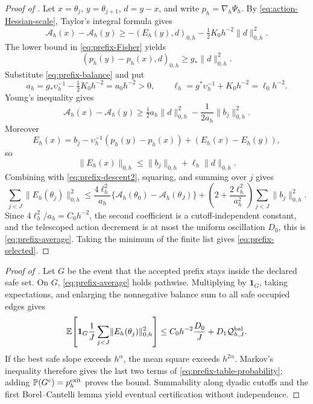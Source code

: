 \documentclass[11pt]{article}
\numberwithin{equation}{section}
\theoremstyle{definition}
\theoremstyle{remark}
\newcommand{\norm}[1]{\lVert#1\rVert}
\begin{document}
\begin{proof}[Proof of ]
Let $x=\theta_j$, $y=\theta_{j+1}$, $d=y-x$, and write $p_h=\nabla_h\Psi_h$.  By \eqref{eq:action-Hessian-scale}, Taylor's integral formula gives
\begin{equation}
 \mathcal A_h(x)-\mathcal A_h(y)
 \ge -(E_h(y),d)_{0,h}-\tfrac12K_0h^{-2}\norm d_{0,h}^2.
 \label{eq:prefix-descent1}
\end{equation}
The lower bound in \eqref{eq:prefix-Fisher} yields
\[
 (p_h(y)-p_h(x),d)_{0,h}\ge g_*\norm d_{0,h}^2.
\]
Substitute \eqref{eq:prefix-balance} and put
\[
 a_h=g_*\upsilon_h^{-1}-\tfrac12K_0h^{-2}=a_0h^{-2}>0,
 \qquad
 \ell_h=g^*\upsilon_h^{-1}+K_0h^{-2}=\ell_0h^{-2}.
\]
Young's inequality gives
\begin{equation}
 \mathcal A_h(x)-\mathcal A_h(y)
 \ge \tfrac12a_h\norm d_{0,h}^2
 -\frac1{2a_h}\norm{b_j}_{0,h}^2.
 \label{eq:prefix-descent2}
\end{equation}
Moreover
\[
 E_h(x)=b_j-\upsilon_h^{-1}(p_h(y)-p_h(x))
                 +(E_h(x)-E_h(y)),
\]
so
\[
 \norm{E_h(x)}_{0,h}\le\norm{b_j}_{0,h}+\ell_h\norm d_{0,h}.
\]
Combining with \eqref{eq:prefix-descent2}, squaring, and summing over $j$ gives
\[
 \sum_{j<J}\norm{E_h(\theta_j)}_{0,h}^2
 \le \frac{4\ell_h^2}{a_h}
       \{\mathcal A_h(\theta_0)-\mathcal A_h(\theta_J)\}
 +\left(2+\frac{2\ell_h^2}{a_h^2}\right)
       \sum_{j<J}\norm{b_j}_{0,h}^2.
\]
Since $4\ell_h^2/a_h=C_0h^{-2}$, the second coefficient is a cutoff-independent constant, and the telescoped action decrement is at most the uniform oscillation $D_0$, this is \eqref{eq:prefix-average}.  Taking the minimum of the finite list gives \eqref{eq:prefix-selected}.
\end{proof}

\begin{proof}[Proof of ]
Let $G$ be the event that the accepted prefix stays inside the declared safe set.  On $G$, \eqref{eq:prefix-average} holds pathwise.  Multiplying by $\mathbf1_G$, taking expectations, and enlarging the nonnegative balance sum to all safe occupied edges gives
\[
 \mathbb E\!\left[\mathbf1_G\frac1J\sum_{j<J}
     \norm{E_h(\theta_j)}_{0,h}^2\right]
 \le C_0h^{-2}\frac{D_0}{J}+D_1\mathcal Q_{h,J}^{\rm bal}.
\]
If the best safe slope exceeds $h^\alpha$, the mean square exceeds $h^{2\alpha}$.  Markov's inequality therefore gives the last two terms of \eqref{eq:prefix-table-probability}; adding $\mathbb P(G^c)=p_h^{\rm exit}$ proves the bound.  Summability along dyadic cutoffs and the first Borel--Cantelli lemma yield eventual certification without independence.
\end{proof}
\end{document}
